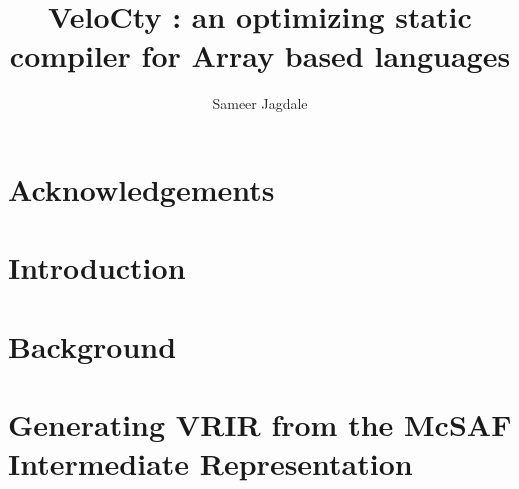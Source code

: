 \documentclass[MSc,twoside,openright]{Thesis}
\title{VeloCty : an optimizing static compiler for Array based languages }
\author{Sameer Jagdale}
\begin{document}
\pagestyle{empty}

\maketitle
\cleardoublepage


\preface %

\begin{Abstract}

\end{Abstract}

\begin{Resume}

\end{Resume}

\chapter*{Acknowledgements}



\renewcommand{\contentsname}{Table of Contents}%
\addto\captionsenglish{%
  \renewcommand{\contentsname}%
    {Table of Contents}%
}
\addto\captionsenglish{%
  \renewcommand{\lstlistlistingname}%
    {List of Listings}%
}

\tableofcontents
\listoffigures
\listoftables
\renewcommand{\lstlistlistingname}{List of Listings}
\lstlistoflistings 
\cleardoublepage

\maintext %

\pagestyle{fancyplain}

\chapter{Introduction} \label{chap:Introduction}

\chapter{Background} \label{chap:Background}

\chapter{Generating VRIR from the  McSAF Intermediate Representation} \label{chap:McSAFTranslate}

\end{document}
